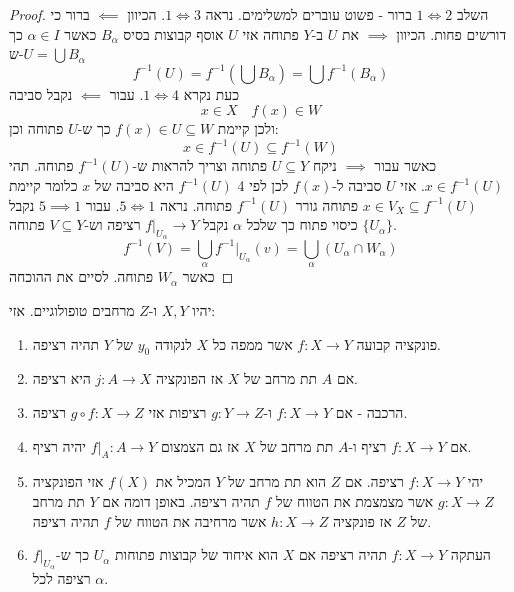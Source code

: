 \documentclass{tstextbook}
\begin{document}
\begin{proof}
השלב \(1\iff 2\) ברור - פשוט עוברים למשלימים.
נראה \(1\iff 3\). הכיוון \(\impliedby\) ברור כי דורשים פחות. הכיוון \(\implies\) את \(U\) ב-\(Y\) פתוחה אזי \(U\) אוסף קבוצות בסיס \(B_{\alpha}\) כאשר \(\alpha \in I\) כך ש-\(U=\bigcup B_{\alpha}\)$$f^{-1} (U)=f^{-1} \left( \bigcup B_{\alpha} \right)=\bigcup f^{-1} (B_{\alpha})$$
כעת נקרא \(1\iff 4\). עבור \(\impliedby\) נקבל סביבה 
$$x \in X \quad  f(x) \in W$$
ולכן קיימת \(f(x) \in U \subseteq W\) כך ש-\(U\) פתוחה וכן:
$$x \in f^{-1} (U)\subseteq f^{-1} (W)$$
כאשר עבור \(\implies\) ניקח \(U \subseteq Y\) פתוחה וצריך להראות ש-\(f^{-1}(U)\) פתוחה. תהי \(x \in f^{-1}(U)\). אזי \(U\) סביבה ל-\(f(x)\) לכן לפי 4 \(f^{-1}(U)\) היא סביבה של \(x\) כלומר קיימת \(x \in V_{X}\subseteq f^{-1}(U)\) פתוחה גורר \(f^{-1}(U)\) פתוחה.
נראה \(5 \iff 1\). עבור \(5\implies 1\) נקבל \(\{ U_{\alpha} \}\) כיסוי פתוח כך שלכל \(\alpha\) נקבל \(f|_{U_{\alpha}}\to Y\) רציפה וש-\(V\subseteq Y\) פתוחה.
$$f^{-1} (V)=\bigcup_{\alpha} f^{-1} |_{U_{\alpha}}(v)=\bigcup_{\alpha}(U_{\alpha}\cap  W_{\alpha})$$
כאשר \(W_{\alpha}\) פתוחה.
לסיים את ההוכחה

\end{proof}
\begin{proposition}
יהיו \(X,Y\) ו-\(Z\) מרחבים טופולוגיים. אזי:

  \begin{enumerate}
    \item פונקציה קבועה \(f:X\to Y\) אשר ממפה כל \(X\) לנקודה \(y_{0}\) של \(Y\) תהיה רציפה. 


    \item אם \(A\) תת מרחב של \(X\) אז הפונקציה \(j:A\to X\) היא רציפה. 


    \item הרכבה - אם \(f:X\to Y\) ו-\(g:Y\to Z\) רציפות אזי \(g\circ f:X\to Z\) רציפה. 


    \item אם \(f:X\to Y\) רציף ו-\(A\) תת מרחב של \(X\) אז גם הצמצום \(f|_{A}:A\to Y\) יהיה רציף. 


    \item יהי \(f:X\to Y\) רציפה. אם \(Z\) הוא תת מרחב של \(Y\) המכיל את \(f(X)\) אזי הפונקציה \(g:X\to Z\) אשר מצמצמת את הטווח של \(f\) תהיה רציפה. באופן דומה אם \(Y\) תת מרחב של \(Z\) אז פונקציה \(h:X\to Z\) אשר מרחיבה את הטווח של \(f\) תהיה רציפה. 


    \item העתקה \(f:X\to Y\) תהיה רציפה אם \(X\) הוא איחוד של קבוצות פתוחות \(U_{\alpha}\) כך ש-\(f|_{U_{\alpha}}\) רציפה לכל \(\alpha\). 


  \end{enumerate}
\end{proposition}
\end{document}
